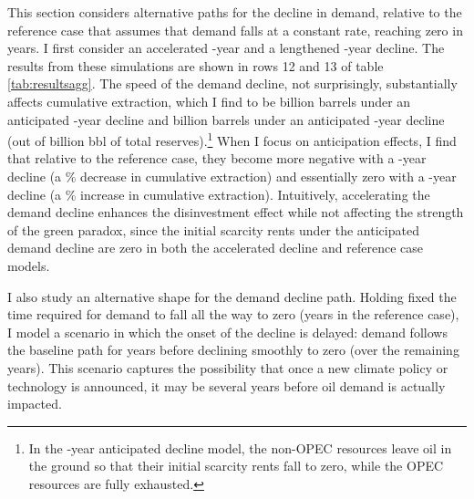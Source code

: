 \documentclass[12pt]{article}
\begin{document}
This section considers alternative paths for the decline in demand, relative to the reference case that assumes that demand falls at a constant rate, reaching zero in years. I first consider an accelerated \unskip-year and a lengthened \unskip-year decline. The results from these simulations are shown in rows 12 and 13 of table \ref{tab:resultsagg}. The speed of the demand decline, not surprisingly, substantially affects cumulative extraction, which I find to be billion barrels under an anticipated \unskip-year decline and billion barrels under an anticipated \unskip-year decline (out of billion bbl of total reserves).\footnote{In the \unskip-year anticipated decline model, the non-OPEC resources leave oil in the ground so that their initial scarcity rents fall to zero, while the OPEC resources are fully exhausted.} When I focus on anticipation effects, I find that relative to the reference case, they become more negative with a \unskip-year decline (a \unskip\% decrease in cumulative extraction) and essentially zero with a \unskip-year decline (a \unskip\% increase in cumulative extraction). Intuitively, accelerating the demand decline enhances the disinvestment effect while not affecting the strength of the green paradox, since the initial scarcity rents under the anticipated demand decline are zero in both the accelerated decline and reference case models.

I also study an alternative shape for the demand decline path. Holding fixed the time required for demand to fall all the way to zero (years in the reference case), I model a scenario in which the onset of the decline is delayed: demand follows the baseline path for years before declining smoothly to zero (over the remaining years). This scenario captures the possibility that once a new climate policy or technology is announced, it may be several years before oil demand is actually impacted. 
\end{document}
